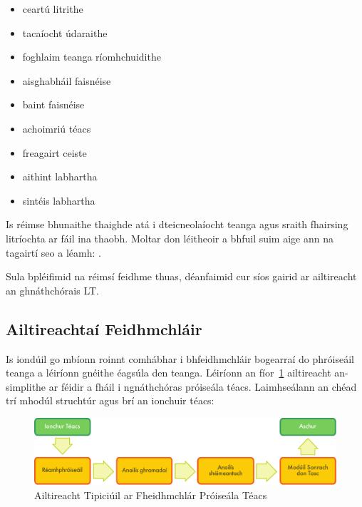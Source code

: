 \documentclass[]{../../metanetpaper}
\begin{document}
\begin{multicols}{2}
\begin{itemize}
\item ceartú litrithe
\item tacaíocht údaraithe
\item foghlaim teanga ríomhchuidithe
\item aisghabháil faisnéise
\item baint faisnéise
\item achoimriú téacs
\item freagairt ceiste
\item aithint labhartha 
\item sintéis labhartha
\end{itemize}

Is réimse bhunaithe thaighde atá i dteicneolaíocht teanga agus sraith fhairsing litríochta ar fáil ina thaobh. Moltar don léitheoir a bhfuil suim aige ann na tagairtí seo a léamh: \cite{carstensen-etal1} \cite{jurafsky-martin01} \cite{manning-schuetze1} \cite{lt-world1} \cite{lt-survey1}. %

Sula bpléifimid na réimsí feidhme thuas, déanfaimid cur síos gairid ar ailtireacht an ghnáthchórais LT.

\subsection{Ailtireachtaí Feidhmchláir}

Is iondúil go mbíonn roinnt comhábhar i bhfeidhmchláir bogearraí do phróiseáil teanga a léiríonn gnéithe éagsúla den teanga. Léiríonn an fíor~\ref{fig:textprocessingarch_de} ailtireacht an-simplithe ar féidir a fháil i ngnáthchóras próiseála téacs. Laimhseálann an chéad trí mhodúl struchtúr agus brí an ionchuir téacs:

\begin{figure}[htb]
  \center
  \includegraphics[width=\textwidth]{../_media/irish/text_processing_app_architecture}
  \caption{Ailtireacht Tipiciúil ar Fheidhmchlár Próiseála Téacs}
  \label{fig:textprocessingarch_de}
\end{figure}


\end{multicols}
\end{document}

